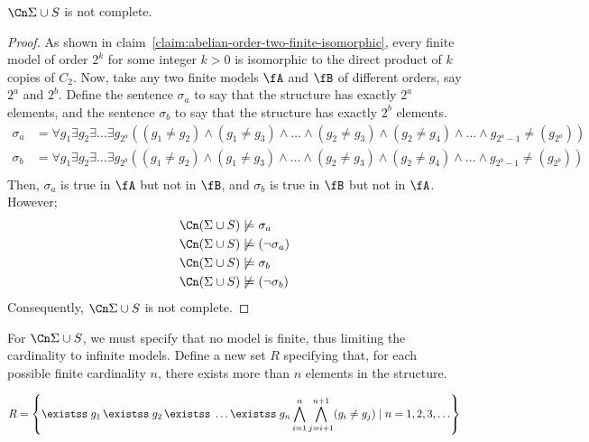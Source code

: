 \newpage
\begin{claim}
  $\Cn \Sigma \cup S$ is not complete.

  \begin{proof}
    As shown in claim~\ref{claim:abelian-order-two-finite-isomorphic},
    every finite model of order $2^k$ for some integer $k > 0$ is isomorphic to
    the direct product of $k$ copies of $C_2$.
    Now, take any two finite models $\fA$ and $\fB$ of different orders, say $2^a$ and $2^b$.
    Define the sentence $\sigma_a$ to say that the structure has exactly $2^a$ elements,
    and the sentence $\sigma_b$ to say that the structure has exactly $2^b$ elements.
    \begin{align*}
      \sigma_a &= \forall g_1 \exists g_2 \exists \ldots \exists g_{2^a}
      ((g_1 \neq g_2) \land (g_1 \neq g_3) \land \ldots \land (g_2 \neq g_3) \land(g_2 \neq g_4) \land \ldots \land g_{2^a-1} \neq (g_{2^a})) \\
      \sigma_b &= \forall g_1 \exists g_2 \exists \ldots \exists g_{2^b}
      ((g_1 \neq g_2) \land (g_1 \neq g_3) \land \ldots \land (g_2 \neq g_3) \land(g_2 \neq g_4) \land \ldots \land g_{2^b-1} \neq (g_{2^b})) \\
    \end{align*}
    Then, $\sigma_a$ is true in $\fA$ but not in $\fB$, and $\sigma_b$ is true in $\fB$ but not in $\fA$.
    However;
    \begin{align*}
      \Cn (\Sigma \cup S) &\not\models \sigma_a \\
      \Cn (\Sigma \cup S) &\not\models (\neg \sigma_a) \\
      \Cn (\Sigma \cup S) &\not\models \sigma_b \\
      \Cn (\Sigma \cup S) &\not\models (\neg \sigma_b)
    \end{align*}
    Consequently, $\Cn \Sigma \cup S$ is not complete.
  \end{proof}
\end{claim}

For $\Cn \Sigma \cup S$, we must specify that no model is finite,
thus limiting the cardinality to infinite models.
Define a new set $R$ specifying that, for each possible finite cardinality
$n$, there exists more than $n$ elements in the structure.

\[
  R = \set{ \exists g_1\, \exists g_2\, \exists \ldots \exists g_n
    \bigwedge_{i=1}^{n} \bigwedge_{j=i+1}^{n+1} (g_i \neq g_j)
    \mid n = 1, 2, 3, \ldots }
\]


